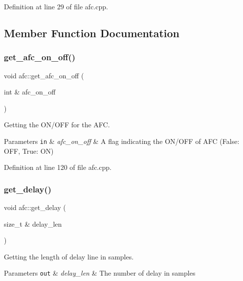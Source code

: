 Definition at line 29 of file afc.\+cpp.



\subsection{Member Function Documentation}
\mbox{\label{classafc_a2119124c7589cb15a7b55568d5301073}} 
\subsubsection{\texorpdfstring{get\+\_\+afc\+\_\+on\+\_\+off()}{get\_afc\_on\_off()}}
{\footnotesize\ttfamily void afc\+::get\+\_\+afc\+\_\+on\+\_\+off (\begin{DoxyParamCaption}\item[{int \&}]{afc\+\_\+on\+\_\+off }\end{DoxyParamCaption})}



Getting the O\+N/\+O\+FF for the A\+FC. 


\begin{DoxyParams}[1]{Parameters}
\mbox{\tt in}  & {\em afc\+\_\+on\+\_\+off} & A flag indicating the O\+N/\+O\+FF of A\+FC (False\+: O\+FF, True\+: ON) \\
\hline
\end{DoxyParams}


Definition at line 120 of file afc.\+cpp.

\mbox{\label{classafc_abe939a99bca35b708ffd66bef80abeb4}} 
\subsubsection{\texorpdfstring{get\+\_\+delay()}{get\_delay()}}
{\footnotesize\ttfamily void afc\+::get\+\_\+delay (\begin{DoxyParamCaption}\item[{size\+\_\+t \&}]{delay\+\_\+len }\end{DoxyParamCaption})}



Getting the length of delay line in samples. 


\begin{DoxyParams}[1]{Parameters}
\mbox{\tt out}  & {\em delay\+\_\+len} & The number of delay in samples \\
\hline
\end{DoxyParams}


